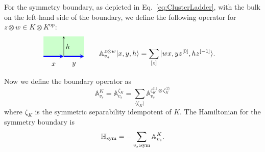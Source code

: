 \documentclass[a4paper,11pt]{article}
\theoremstyle{theorem}
\theoremstyle{remark}
\newcommand{\Av}{\mathbb{A}}
\newcommand{\Hbb}{\mathbb{H}}
\begin{document}
For the symmetry boundary, as depicted in Eq.~\eqref{eq:ClusterLadder}, with the bulk on the left-hand side of the boundary, we define the following operator for \(z \otimes w \in K \otimes K^{\mathrm{op}}\):
\begin{align}
       \begin{aligned}
           \begin{tikzpicture}
    \begin{scope}[rotate=90] %
        \fill[green!20] (0, 0) rectangle (1,2); %
        \draw[-stealth,blue,line width = 1.6pt] (0,1) -- (0,0);
        \draw[-stealth,blue,line width = 1.6pt] (0,2) -- (0,1); 
        \draw[-stealth,black] (0,1) -- (1,1); 
       	\node[ line width=0.2pt, dashed, draw opacity=0.5] (a) at (-0.4,0.5){$y$};
    		\node[ line width=0.2pt, dashed, draw opacity=0.5] (a) at (-0.4,1.5){$x$};
            \node[ line width=0.2pt, dashed, draw opacity=0.5] (a) at (0.5,0.8){$h$};
    \end{scope}
\end{tikzpicture}
 \end{aligned} & \quad \quad \Av^{z\otimes w}_{v_s}|x,y,h\rangle=\sum_{[z]} | w x, yz^{[0]}, hz^{[-1]}\rangle. \label{eq:Avs2}
\end{align}
Now we define the boundary operator as 
\begin{equation}
    \Av^K_{v_s} = \Av^{\zeta_K}_{v_s} = \sum_{\langle \zeta_K \rangle} \Av^{\zeta_K^{\langle 1 \rangle} \otimes \zeta_K^{\langle 2 \rangle}}_{v_s}
\end{equation}
where \(\zeta_K\) is the symmetric separability idempotent of \( K \). 
The Hamiltonian for the symmetry boundary is
\begin{equation}
    \Hbb_{\rm sym} = -\sum_{v_s: \rm sym} \Av_{v_s}^K.
\end{equation}
\end{document}
